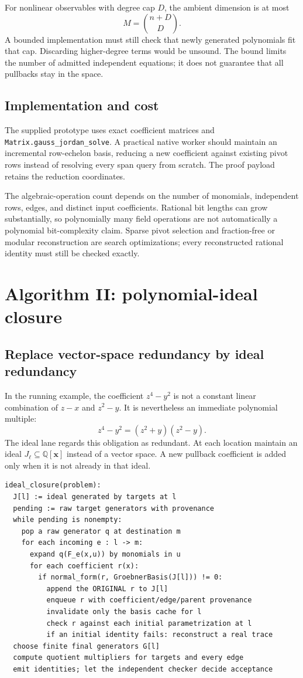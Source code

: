 \documentclass[11pt,letterpaper]{article}
\theoremstyle{definition}
\newcommand{\Q}{\mathbb Q}
\newcommand{\code}[1]{\nolinkurl{#1}}
\begin{document}
For nonlinear observables with degree cap $D$, the ambient dimension is at most
\[
 M=\binom{n+D}{D}.
\]
A bounded implementation must still check that newly generated polynomials fit
that cap. Discarding higher-degree terms would be unsound. The bound limits the
number of admitted independent equations; it does not guarantee that all
pullbacks stay in the space.

\subsection{Implementation and cost}
The supplied prototype uses exact coefficient matrices and
\code{Matrix.gauss_jordan_solve}. A practical native worker should maintain an
incremental row-echelon basis, reducing a new coefficient against existing pivot
rows instead of resolving every span query from scratch. The proof payload
retains the reduction coordinates.

The algebraic-operation count depends on the number of monomials, independent
rows, edges, and distinct input coefficients. Rational bit lengths can grow
substantially, so polynomially many field operations are not automatically a
polynomial bit-complexity claim. Sparse pivot selection and fraction-free or
modular reconstruction are search optimizations; every reconstructed rational
identity must still be checked exactly.

\section{Algorithm II: polynomial-ideal closure}
\label{sec:ideal}

\subsection{Replace vector-space redundancy by ideal redundancy}
In the running example, the coefficient $z^4-y^2$ is not a constant linear
combination of $z-x$ and $z^2-y$. It is nevertheless an immediate polynomial
multiple:
\[
 z^4-y^2=(z^2+y)(z^2-y).
\]
The ideal lane regards this obligation as redundant. At each location maintain
an ideal $J_\ell\subseteq\Q[\bm x]$ instead of a vector space. A new pullback
coefficient is added only when it is not already in that ideal.

\begin{lstlisting}
ideal_closure(problem):
  J[l] := ideal generated by targets at l
  pending := raw target generators with provenance
  while pending is nonempty:
    pop a raw generator q at destination m
    for each incoming e : l -> m:
      expand q(F_e(x,u)) by monomials in u
      for each coefficient r(x):
        if normal_form(r, GroebnerBasis(J[l])) != 0:
          append the ORIGINAL r to J[l]
          enqueue r with coefficient/edge/parent provenance
          invalidate only the basis cache for l
          check r against each initial parametrization at l
          if an initial identity fails: reconstruct a real trace
  choose finite final generators G[l]
  compute quotient multipliers for targets and every edge
  emit identities; let the independent checker decide acceptance
\end{lstlisting}
\end{document}
